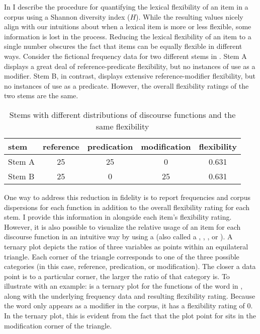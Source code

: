 In  I describe the procedure for quantifying the lexical flexibility of an item in a corpus using a Shannon diversity index ($H$). While the resulting values nicely align with our intuitions about when a lexical item is more or less flexible, some information is lost in the process. Reducing the lexical flexibility of an item to a single number obscures the fact that items can be equally flexible in different ways. Consider the fictional frequency data for two different stems in . Stem A displays a great deal of reference-predicate flexibility, but no instances of use as a modifier. Stem B, in contrast, displays extensive reference-modifier flexibility, but no instances of use as a predicate. However, the overall flexibility ratings of the two stems are the same.

\begin{table}
  \centering
  \caption{Stems with different distributions of discourse functions and the same flexibility}
  \label{tab:equal-flexibility-stems}
  \begin{tabular}{ l c c c c }
    \toprule
    stem   & reference & predication & modification & flexibility\\
    \midrule
    Stem A & 25        & 25          & 0            & 0.631      \\
    Stem B & 25        & 0           & 25           & 0.631      \\
    \bottomrule
  \end{tabular}
\end{table}

One way to address this reduction in fidelity is to report frequencies and corpus dispersions for each function in addition to the overall flexibility rating for each stem. I provide this information in  alongside each item's flexibility rating. However, it is also possible to visualize the relative usage of an item for each discourse function in an intuitive way by using a  (also called a , , , or ). A ternary plot depicts the ratios of three variables as points within an equilateral triangle. Each corner of the triangle corresponds to one of the three possible categories (in this case, reference, predication, or modification). The closer a data point is to a particular corner, the larger the ratio of that category is. To illustrate with an example:  is a ternary plot for the functions of the word  in , along with the underlying frequency data and resulting flexibility rating. Because the word  only appears as a modifier in the corpus, it has a flexibility rating of $0$. In the ternary plot, this is evident from the fact that the plot point for  sits in the modification corner of the triangle.

